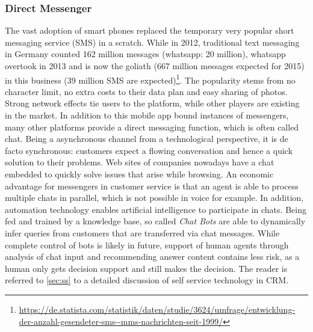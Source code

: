 		\subsubsection{Direct Messenger}
		The vast adoption of smart phones replaced the temporary very popular short messaging service (SMS) in a scratch.  While in 2012, traditional text messaging in Germany counted 162 million messages (whatsapp: 20 million), whatsapp overtook in 2013 and is now the goliath (667 million messages expected for 2015) in this business (39 million SMS are expected)\footnote{\cf \url{https://de.statista.com/statistik/daten/studie/3624/umfrage/entwicklung-der-anzahl-gesendeter-sms--mms-nachrichten-seit-1999/}}. The popularity stems from no character limit, no extra costs to their data plan and easy sharing of photos. Strong network effects tie users to the platform, while other players are existing in the market. In addition to this mobile app bound instances of messengers, many other platforms provide a direct messaging function, which is often called chat. Being a asynchronous channel from a technological perspective, it is de facto synchronous: customers expect a flowing conversation and hence a quick solution to their problems. Web sites of companies nowadays have a chat embedded to quickly solve issues that arise while browsing. An economic advantage for messengers in customer service is that an agent is able to process multiple chats in parallel, which is not possible in voice for example. In addition, automation technology enables artificial intelligence to participate in chats. Being fed and trained by a knowledge base, so called \textit{Chat Bots} are able to dynamically infer queries from customers that are transferred via chat messages. While complete control of bots is likely in future, support of human agents through analysis of chat input and recommending answer content contains less risk, as a human only gets decision support and still makes the decision. The reader is referred to \ref{sec:ss} to a detailed discussion of self service technology in \acrshort{CRM}. 
		
		
